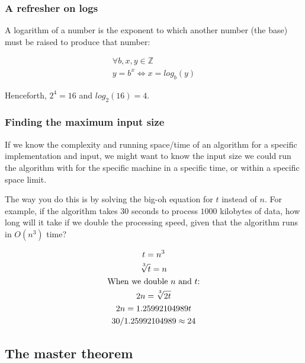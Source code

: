 \subsubsection{A refresher on logs}
\label{subsubsec:logs}

A logarithm of a number is the exponent to which another number (the base) must
be raised to produce that number:

\begin{gather*}
  \forall b,x,y \in \mathbb{Z}\\
  y = b^x \Leftrightarrow x = log_b(y)
\end{gather*}

Henceforth, $2^4 = 16$ and $log_2(16) = 4$.

\subsubsection{Finding the maximum input size}

If we know the complexity and running space/time of an algorithm for a specific
implementation and input, we might want to know the input size we could run the
algorithm with for the specific machine in a specific time, or within a specific
space limit.

The way you do this is by solving the big-oh equation for $t$ instead of $n$.
For example, if the algorithm takes $30$ seconds to process $1000$ kilobytes of
data, how long will it take if we double the processing speed, given that the
algorithm runs in $O(n^3)$ time?


\begin{gather*}
  t = n^3\\
  \sqrt[\leftroot{-0}\uproot{3}3]{t} = n\\
  \text{When we double $n$ and $t$:}\\
  2n = \sqrt[\leftroot{-0}\uproot{3}3]{2t}\\
  2n = 1.25992104989t\\
  30 / 1.25992104989 \approx 24\\
\end{gather*}

\subsection{The master theorem}


